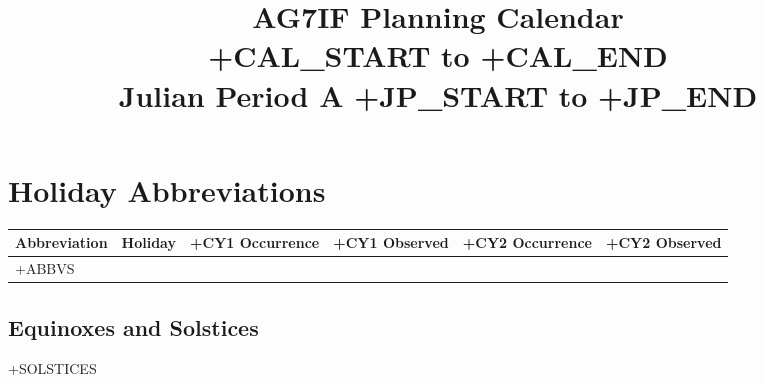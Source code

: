 \documentclass[10pt]{book}
\title{\Huge{}AG7IF Planning Calendar \\ +CAL_START to +CAL_END \\ Julian Period A +JP_START to +JP_END}
\author{}
\date{}
\begin{document}
\maketitle

\section*{Holiday Abbreviations}
\begin{tabularx}{\textwidth}{lXrrrr}
    \toprule
    Abbreviation & Holiday & +CY1 Occurrence & +CY1 Observed & +CY2 Occurrence & +CY2 Observed \\
    \midrule
    +ABBVS
    \bottomrule
\end{tabularx}

\newpage

\begin{center}
    \section*{Equinoxes and Solstices}
    \vfill
    +SOLSTICES
    \vfill

\end{center}
\end{document}
